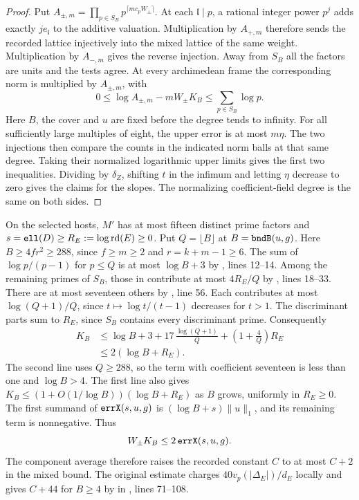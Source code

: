 \begin{proof}
Put \(A_{\pm,m}=\prod_{p\in S_B}p^{\lceil m c_pW_\pm\rceil}\).
At each \(\mathfrak l\mid p\), a rational integer power \(p^j\)
adds exactly \(j e_{\mathfrak l}\) to the additive valuation.
Multiplication by \(A_{+,m}\) therefore sends the recorded lattice
injectively into the mixed lattice of the same weight. Multiplication
by \(A_{-,m}\) gives the reverse injection. Away from \(S_B\) all
the factors are units and the tests agree. At every archimedean frame
the corresponding norm is multiplied by \(A_{\pm,m}\), with
\[
        0\le \log A_{\pm,m}-mW_\pm K_B
                    \le \sum_{p\in S_B}\log p .
\]
Here \(B\), the cover and \(u\) are fixed before the degree tends to
infinity. For all sufficiently large multiples of eight, the upper
error is at most \(m\eta\). The two injections then compare the
counts in the indicated norm balls at that same degree.
Taking their normalized logarithmic upper limits gives the first
two inequalities. Dividing by \(\delta_Z\), shifting \(t\) in
the infimum and letting \(\eta\) decrease to zero gives the claims
for the slopes. The normalizing coefficient-field degree is the
same on both sides.
\end{proof}

On the selected hosts, \(M'\) has at most fifteen distinct prime
factors and \(s=\texttt{ell}(D)\ge R_E:=\log\operatorname{rd}(E)\ge0\).
Put \(Q=\lfloor B\rfloor\) at \(B=\texttt{bndB}(u,g)\). Here
\(B\ge4fr^2\ge288\), since \(f\ge m\ge2\) and
\(r=k+m-1\ge6\). The sum of \(\log p/(p-1)\) for \(p\le Q\)
is at most \(\log B+3\) by , lines
12--14. Among the remaining primes of \(S_B\), those in
 contribute at most \(4R_E/Q\) by
, lines 18--33. There are at most seventeen
others by , line 56. Each contributes at most
\(\log(Q+1)/Q\), since \(t\mapsto\log t/(t-1)\) decreases for
\(t>1\). The discriminant parts sum to \(R_E\), since \(S_B\)
contains every discriminant prime. Consequently
\begin{align*}
 K_B&\le\log B+3+17\,\frac{\log(Q+1)}{Q}
                 +\left(1+\frac4Q\right)R_E\\
    &\le 2(\log B+R_E).
\end{align*}
The second line uses \(Q\ge288\), so the term with coefficient
seventeen is less than one and \(\log B>4\). The first line also gives
\(K_B\le(1+O(1/\log B))(\log B+R_E)\) as \(B\) grows, uniformly
in \(R_E\ge0\). The first summand of \(\texttt{errX}(s,u,g)\)
is \((\log B+s)\|u\|_1\), and its remaining term is nonnegative. Thus
\[
                       W_\pm K_B\le2\,\texttt{errX}(s,u,g).
\]
The component average therefore raises the recorded constant \(C\)
to at most \(C+2\) in the mixed bound. The original estimate charges
\(40v_p(|\Delta_E|)/d_E\) locally and gives \(C+44\) for \(B\ge4\)
by  in , lines
71--108.

